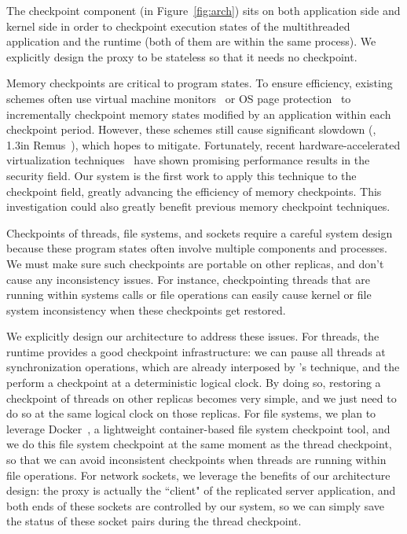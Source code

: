 The \crane checkpoint component (in Figure~\ref{fig:arch}) sits on both
application side and kernel side in order to checkpoint execution states of the
multithreaded application and the \smt runtime (both of them are within the
same process). We explicitly design the proxy to be stateless so that it needs
no checkpoint.

Memory checkpoints are critical to program states. To ensure efficiency,
existing schemes often use virtual machine monitors~\cite{remus:nsdi08} or OS
page protection~\cite{oren:atc07} to incrementally checkpoint memory states
modified by an application within each checkpoint period. However, these schemes
still cause significant slowdown (\eg, 1.3\X in Remus~\cite{remus:nsdi08}), which
\crane hopes to mitigate. Fortunately, recent hardware-accelerated
virtualization techniques~\cite{dune:osdi12} have shown promising performance
results in the security field. Our \crane system is the first work to apply this
technique to the checkpoint field, greatly advancing the efficiency of memory
checkpoints. This investigation could also greatly benefit previous memory
checkpoint techniques.

Checkpoints of threads, file systems, and sockets require a careful \crane
system design because these program states often involve multiple \crane
components and processes. We must make sure such checkpoints are portable on
other replicas, and don't cause any inconsistency issues. For instance,
checkpointing threads that are running within systems calls or file operations
can easily cause kernel or file system inconsistency when these checkpoints get
restored.

We explicitly design our \crane architecture to address these issues. For
threads, the \parrot \smt runtime provides a good checkpoint infrastructure: we
can pause all threads at synchronization operations, which are already
interposed by \parrot's \ldpreload technique, and the perform a checkpoint at a
deterministic logical clock. By doing so, restoring a checkpoint of threads on
other replicas becomes very simple, and we just need to do so at the same
logical clock on those replicas. For file systems, we plan to leverage
Docker~\cite{docker}, a lightweight container-based file system checkpoint tool,
and we do this file system checkpoint at the same moment as the thread
checkpoint, so that we can avoid inconsistent checkpoints when threads are
running within file operations. For network sockets, we leverage the benefits of
our architecture design: the proxy is actually the ``client" of the replicated
server application, and both ends of these sockets are controlled by our system,
so we can simply save the 
status of these socket pairs during the thread checkpoint.










